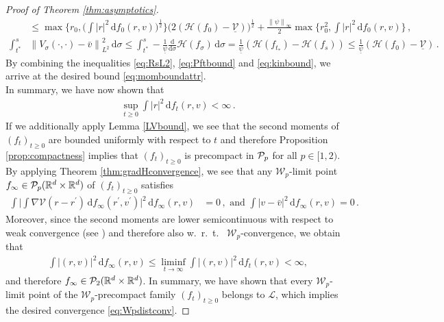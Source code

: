 \documentclass[11pt]{article}
\newcommand{\R}[0]{\mathbb R}
\newcommand{\dx}[1]{\frac{\mathrm{d}}{\mathrm{d}#1}}
\newcommand{\norm}[1]{\left\| #1 \right\|}
\newcommand{\abs}[1]{\left| #1 \right|}
\newcommand{\Pp}[1]{
    \ifx #1\infty
        \mathcal{P}_{c}
    \else 
        \mathcal{P}_{#1}
    \fi 
}
\newcommand{\Wpdist}{\mathcal{W}}
\newcommand{\msolinit}[1]{f_0(#1)}
\newcommand{\msolt}[2]{f_{#1}(#2)}
\newcommand{\charV}[2]{V_{#1}(#2)}
\begin{document}
\begin{bibunit}[unsrtnat]
\begin{proof}[Proof of Theorem \ref{thm:asymptotics}]
\begin{align}
            &\leq \max \Big\{ r_0, \Big( \int  \abs{r}^2 \, \mathrm{d}\msolinit{r,v} \Big)^{\frac{1}{2} } \Big\} \big( 2(\mathcal{H}(f_{0}) - \underline{\mathcal{V}}) \big)^{\frac{1}{2}} 
             + \frac{\norm{\psi}_\infty}{2} \max \Big\{ r_0^{2}, \int \abs{r}^2 \, \mathrm{d}\msolinit{r,v} \Big\}  \, , \label{eq:Pftbound} \\  
        \int_{t^*}^{s} &\norm{\charV{\sigma}{\cdot,\cdot} - \bar{v}}^{2}_{L^{2}} \, \mathrm{d}\sigma 
            \leq \int_{t^*}^s - \frac{1}{\underline{\psi}} \dx{\sigma} \mathcal{H}(f_\sigma) \, \mathrm{d}\sigma 
            = \frac{1}{\underline{\psi}} (\mathcal{H}(f_{t_*}) - \mathcal{H}(f_s) ) 
            \leq \frac{1}{\underline{\psi}} (\mathcal{H}(f_{0}) - \underline{\mathcal{V}} ) \, . \label{eq:kinbound}
        \end{align}
        By combining the inequalities \eqref{eq:RsL2}, \eqref{eq:Pftbound} and \eqref{eq:kinbound}, we arrive at the desired bound \eqref{eq:momboundattr}. \\ 
        In summary, we have now shown that
        \begin{align*}
            \sup_{t \geq 0} \int \abs{r}^2 \, \mathrm{d} \msolt{t}{r,v} < \infty \, .
        \end{align*}
        If we additionally apply Lemma \ref{LVbound}, we see that the second moments of $(f_t)_{t \geq 0}$ are bounded uniformly with respect to $t$ and therefore Proposition \ref{prop:compactness} implies that $(f_t)_{t \geq 0}$ is precompact in $\Pp{p}$ for all $p \in [1,2)$. By applying Theorem \ref{thm:gradHconvergence}, we see that any $\Wpdist_p$-limit point $f_\infty \in \Pp{p}(\R^d \times \R^d)$ of $(f_t)_{t \geq 0}$ satisfies 
        \begin{align*}
            \int \Big| \int \nabla \mathcal{V}(r-r^\prime) \, \mathrm{d}f_\infty(r^\prime, v^\prime) \Big|^2 \, \mathrm{d}f_\infty (r,v) &= 0 \, , 
            \text{ and } \int \abs{v-\bar{v}}^2 \, \mathrm{d}f_\infty(r,v) = 0 \, .
        \end{align*}
        Moreover, since the second moments are lower semicontinuous with respect to weak convergence (see \cite[Lemma $12.8$]{Ambrosio}) and therefore also w.~r.~t.~ $\Wpdist_p$-convergence, we obtain that 
        \begin{align*}
            \int \abs{(r,v)}^2 \, \mathrm{d}f_\infty(r,v) \leq \liminf_{t \to \infty } \int \abs{(r,v)}^2 \, \mathrm{d} \msolt{t}{r,v} < \infty, 
        \end{align*}
        and therefore $f_\infty \in \Pp{2}(\R^d \times \R^d)$. In summary, we have shown that every $\Wpdist_p$-limit point of the $\Wpdist_p$-precompact family $(f_t)_{t \geq 0}$ belongs to $\mathcal{L}$, which implies the desired convergence \eqref{eq:Wpdistconv}. 
    \end{proof}


\end{bibunit}
\end{document}
